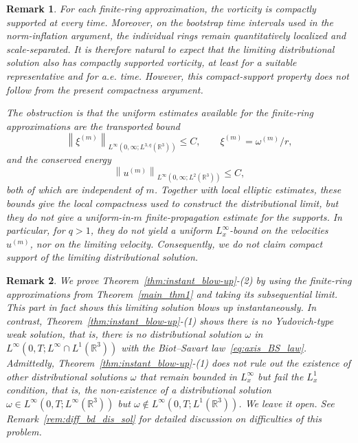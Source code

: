 \documentclass[reqno,11pt]{amsart}
\newtheorem{remark}{Remark}[section]
\begin{document}
\begin{remark}
For each finite-ring approximation, the vorticity is compactly supported at
every time. Moreover, on the bootstrap time intervals used in the norm-inflation
argument, the individual rings remain quantitatively localized and scale-separated.
It is therefore natural to expect that the limiting distributional solution also
has compactly supported vorticity, at least for a suitable representative and for
a.e. time. However, this compact-support property does not follow from the
present compactness argument.

The obstruction is that the uniform estimates available for the finite-ring approximations are the
transported bound
\[
    \left\|\xi^{(m)}\right\|_{L^\infty(0,\infty; L^{3,q}(\mathbb{R}^3))}\le C,
    \qquad \xi^{(m)}=\omega^{(m)}/r,
\]
and the conserved energy
\[
    \left\|u^{(m)}\right\|_{L^\infty (0,\infty;L^2(\mathbb{R}^3))} \leq C,
\]
both of which are independent of \(m\). Together with local elliptic estimates, these bounds give the local compactness
used to construct the distributional limit, but they do not give a uniform-in-\(m\)
finite-propagation estimate for the supports. In particular, for \(q>1\), they do
not yield a uniform \(L^\infty_x\)-bound on the velocities \(u^{(m)}\), nor on the
limiting velocity. Consequently, we do not claim compact support of the limiting
distributional solution.
\end{remark}


\begin{remark}
    We prove Theorem~\ref{thm:instant_blow-up}-(2) by using the finite-ring approximations from Theorem~\ref{main_thm1} and taking its subsequential limit. This part in fact shows this limiting solution blows up instantaneously. In contrast, Theorem~\ref{thm:instant_blow-up}-(1) shows there is no Yudovich-type weak solution, that is, there is no distributional solution $\omega$ in $L^\infty(0,T; L^\infty \cap L^1(\mathbb{R}^3))$ with the Biot--Savart law~\eqref{eq:axis_BS_law}. 
    Admittedly, Theorem~\ref{thm:instant_blow-up}-(1)
    does not rule out the existence of other distributional solutions $\omega$ that remain bounded in $L_x^\infty$ but fail the $L^1_x$ condition, that is, the non-existence of a distributional solution $\omega\in L^\infty(0,T; L^\infty(\mathbb{R}^3))$ but $\omega\notin L^\infty(0,T;L^1(\mathbb{R}^3))$.
    We leave it open. See Remark~\ref{rem:diff_bd_dis_sol} for detailed discussion on difficulties of this problem.    
\end{remark}
\end{document}
